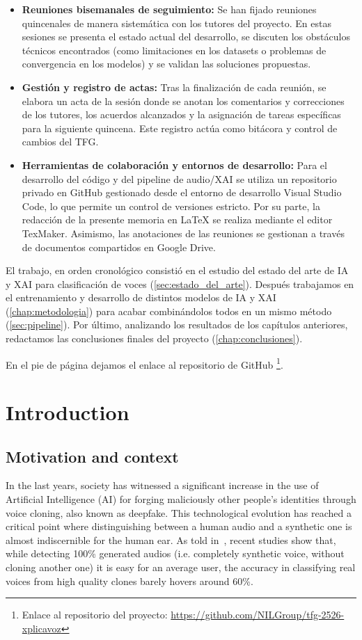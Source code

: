 \begin{itemize}
    \item \textbf{Reuniones bisemanales de seguimiento:} Se han fijado reuniones quincenales de manera sistemática con los tutores del proyecto. En estas sesiones se presenta el estado actual del desarrollo, se discuten los obstáculos técnicos encontrados (como limitaciones en los datasets o problemas de convergencia en los modelos) y se validan las soluciones propuestas.
    \item \textbf{Gestión y registro de actas:} Tras la finalización de cada reunión, se elabora un acta de la sesión donde se anotan los comentarios y correcciones de los tutores, los acuerdos alcanzados y la asignación de tareas específicas para la siguiente quincena. Este registro actúa como bitácora y control de cambios del TFG.
    \item \textbf{Herramientas de colaboración y entornos de desarrollo:} Para el desarrollo del código y del pipeline de audio/XAI se utiliza un repositorio privado en GitHub gestionado desde el entorno de desarrollo Visual Studio Code, lo que permite un control de versiones estricto. Por su parte, la redacción de la presente memoria en LaTeX se realiza mediante el editor TexMaker. Asimismo, las anotaciones de las reuniones se gestionan a través de documentos compartidos en Google Drive.
\end{itemize}

El trabajo, en orden cronológico consistió en el estudio del estado del arte de IA y XAI para clasificación de voces (\autoref{sec:estado_del_arte}). Después trabajamos en el entrenamiento y desarrollo de distintos modelos de IA y XAI (\autoref{chap:metodologia}) para acabar combinándolos todos en un mismo método (\autoref{sec:pipeline}). Por último, analizando los resultados de los capítulos anteriores, redactamos las conclusiones finales del proyecto (\autoref{chap:conclusiones}).

En el pie de página dejamos el enlace al repositorio de GitHub \footnote{Enlace al repositorio del proyecto: \url{https://github.com/NILGroup/tfg-2526-xplicavoz}}.

\chapter*{Introduction}

\section*{Motivation and context}
In the last years, society has witnessed a significant increase in the use of Artificial Intelligence (AI) for forging maliciously other people's identities through voice cloning, also known as deepfake. This technological evolution has reached a critical point where distinguishing between a human audio and a synthetic one is almost indiscernible for the human ear. As told in~\parencite{Barrington2025, Nadine2025}, recent studies show that, while detecting 100\% generated audios (i.e. completely synthetic voice, without cloning another one) it is easy for an average user, the accuracy in classifying real voices from high quality clones barely hovers around 60\%.

